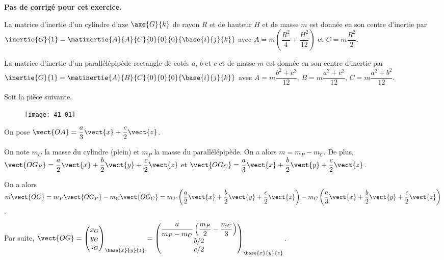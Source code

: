\normaltrue \difficilefalse \tdifficilefalse
\correctiontrue


\setcounter{numques}{0}
\ifcorrection
\else
\textbf{Pas de corrigé pour cet exercice.}
\fi

\ifprof
\else
La matrice d'inertie d'un cylindre d'axe $\axe{G}{k}$ de rayon $R$ et de hauteur $H$ et de masse $m$ est donnée en son centre d'inertie par 
$\inertie{G}{1}=\matinertie{A}{A}{C}{0}{0}{0}{\base{i}{j}{k}}$ avec $A=m\left(\dfrac{R^2}{4}+\dfrac{H^2}{12} \right)$ et $C=m\dfrac{R^2}{2}$. 


La matrice d'inertie d'un parallélépipède rectangle de cotés $a$, $b$ et $c$ et de masse $m$ est donnée en son centre d'inertie par 
$\inertie{G}{1}=\matinertie{A}{B}{C}{0}{0}{0}{\base{i}{j}{k}}$ avec $A={m\dfrac{b^2+c^2}{12}}$, $B={m\dfrac{a^2+c^2}{12}}$, $C={m\dfrac{a^2+b^2}{12}}$.

Soit la pièce suivante. 
\begin{figure}[H]
\centering
\texttt{[image: 41\_01]}
\end{figure}

On pose $\vect{OA}=\dfrac{a}{3}\vect{x}+\dfrac{c}{2}\vect{z}$. 

\fi



\ifprof
On note $m_C$ la masse du cylindre (plein) et $m_P$ la masse du parallélépipède. On a alors $m=m_P-m_C$.
De plus, $\vect{OG_P}=\dfrac{a}{2}\vect{x}+\dfrac{b}{2}\vect{y}+\dfrac{c}{2}\vect{z}$
et $\vect{OG_C}=\dfrac{a}{3}\vect{x}+\dfrac{b}{2}\vect{y}+\dfrac{c}{2}\vect{z}$.

On a alors 
$m \vect{OG}=m_P \vect{OG_P}-m_C \vect{OG_C} = m_P \left(\dfrac{a}{2}\vect{x}+\dfrac{b}{2}\vect{y}+\dfrac{c}{2}\vect{z} \right)-m_C \left( \dfrac{a}{3}\vect{x}+\dfrac{b}{2}\vect{y}+\dfrac{c}{2}\vect{z}\right) $.

Par suite, 
$\vect{OG}=
\begin{pmatrix}
x_G \\ y_G \\ z_G
\end{pmatrix}_{\base{x}{y}{z}}
=
\begin{pmatrix}
\dfrac{a}{m_P-m_C} \left( \dfrac{m_P}{2} -  \dfrac{m_C}{3}\right) \\
b/2 \\
c/2
\end{pmatrix}_{\base{x}{y}{z}}
$.
\else
\fi

